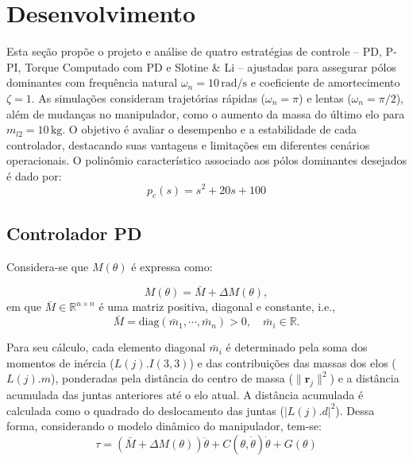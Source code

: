 \documentclass[10pt]{article}
\begin{document}
\section{Desenvolvimento}

Esta seção propõe o projeto e análise de quatro estratégias de controle – PD, P-PI, Torque Computado com PD e Slotine \& Li – ajustadas para assegurar pólos dominantes com frequência natural \(\omega_n = 10 \, \text{rad/s}\) e coeficiente de amortecimento \(\zeta = 1\).
As simulações consideram trajetórias rápidas (\(\omega_n = \pi\)) e lentas (\(\omega_n = \pi/2\)), além de mudanças no manipulador, como o aumento da massa do último elo para \(m_{l2} = 10 \, \text{kg}\).
O objetivo é avaliar o desempenho e a estabilidade de cada controlador, destacando suas vantagens e limitações em diferentes cenários operacionais.
O polinômio característico associado aos pólos dominantes desejados é dado por:
\begin{equation}
    p_c(s) = s^2 + 20s + 100
\end{equation}

\subsection{Controlador PD}

Considera-se que \(M(\theta)\) é expressa como:

\begin{equation}
    M(\theta) = \bar{M} + \Delta M(\theta),
\end{equation}
em que \(\bar{M} \in \mathbb{R}^{n \times n}\) é uma matriz positiva, diagonal e constante, i.e.,
\begin{equation}
    \bar{M} = \text{diag}(\bar{m}_1, \cdots, \bar{m}_n) > 0, \quad \bar{m}_i \in \mathbb{R}.
\end{equation}

Para seu cálculo, cada elemento diagonal $\bar{m}_i$ é determinado pela soma dos momentos de inércia ($L(j).I(3,3)$) e das contribuições das massas dos elos ($L(j).m$), ponderadas pela distância do centro de massa ($\|\mathbf{r}_j\|^2$) e a distância acumulada das juntas anteriores até o elo atual. A distância acumulada é calculada como o quadrado do deslocamento das juntas ($|L(j).d|^2$).
Dessa forma, considerando o modelo dinâmico do manipulador, tem-se:
\begin{equation}
    \tau = (\bar{M} + \Delta M(\theta)) \ddot{\theta} + C(\theta,\dot{\theta}) \dot{\theta} + G(\theta)
\end{equation}
\end{document}
